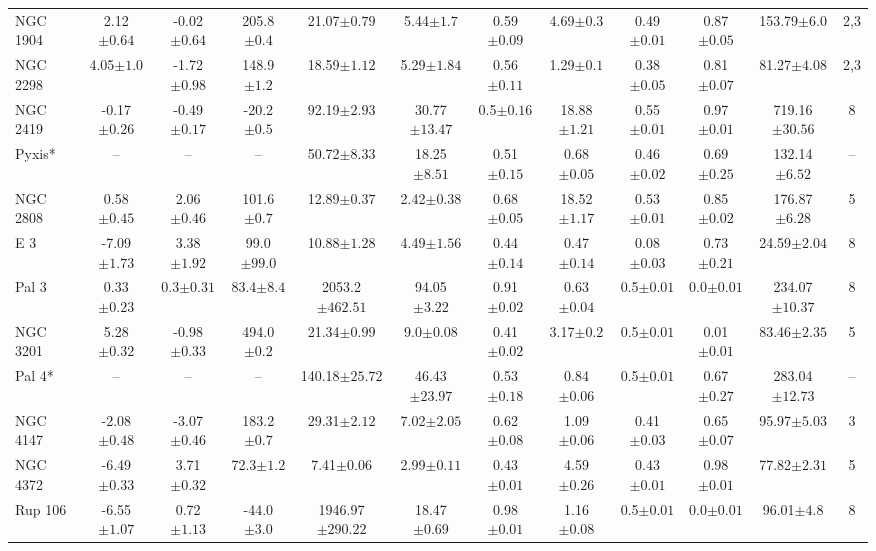 \begin{landscape}
\begin{table}
\begin{tabular}{lccccccccccc}
NGC 1904 & 2.12$\pm{0.64}$ & -0.02$\pm{0.64}$ & 205.8$\pm{0.4}$ & 21.07$\pm{0.79}$ & 5.44$\pm{1.7}$ & 0.59$\pm{0.09}$ & 4.69$\pm{0.3}$ & 0.49$\pm{0.01}$ & 0.87$\pm{0.05}$ & 153.79$\pm{6.0}$&2,3 \\ 
NGC 2298 & 4.05$\pm{1.0}$ & -1.72$\pm{0.98}$ & 148.9$\pm{1.2}$ & 18.59$\pm{1.12}$ & 5.29$\pm{1.84}$ & 0.56$\pm{0.11}$ & 1.29$\pm{0.1}$ & 0.38$\pm{0.05}$ & 0.81$\pm{0.07}$ & 81.27$\pm{4.08}$&2,3 \\ 
NGC 2419 & -0.17$\pm{0.26}$ & -0.49$\pm{0.17}$ & -20.2$\pm{0.5}$ & 92.19$\pm{2.93}$ & 30.77$\pm{13.47}$ & 0.5$\pm{0.16}$ & 18.88$\pm{1.21}$ & 0.55$\pm{0.01}$ & 0.97$\pm{0.01}$ & 719.16$\pm{30.56}$&8 \\ 
Pyxis* & -- & -- & -- & 50.72$\pm{8.33}$ & 18.25$\pm{8.51}$ & 0.51$\pm{0.15}$ & 0.68$\pm{0.05}$ & 0.46$\pm{0.02}$ & 0.69$\pm{0.25}$ & 132.14$\pm{6.52}$&-- \\ 
NGC 2808 & 0.58$\pm{0.45}$ & 2.06$\pm{0.46}$ & 101.6$\pm{0.7}$ & 12.89$\pm{0.37}$ & 2.42$\pm{0.38}$ & 0.68$\pm{0.05}$ & 18.52$\pm{1.17}$ & 0.53$\pm{0.01}$ & 0.85$\pm{0.02}$ & 176.87$\pm{6.28}$&5 \\ 
E 3 & -7.09$\pm{1.73}$ & 3.38$\pm{1.92}$ & 99.0$\pm{99.0}$ & 10.88$\pm{1.28}$ & 4.49$\pm{1.56}$ & 0.44$\pm{0.14}$ & 0.47$\pm{0.14}$ & 0.08$\pm{0.03}$ & 0.73$\pm{0.21}$ & 24.59$\pm{2.04}$&8 \\ 
Pal 3 & 0.33$\pm{0.23}$ & 0.3$\pm{0.31}$ & 83.4$\pm{8.4}$ & 2053.2$\pm{462.51}$ & 94.05$\pm{3.22}$ & 0.91$\pm{0.02}$ & 0.63$\pm{0.04}$ & 0.5$\pm{0.01}$ & 0.0$\pm{0.01}$ & 234.07$\pm{10.37}$&8 \\ 
NGC 3201 & 5.28$\pm{0.32}$ & -0.98$\pm{0.33}$ & 494.0$\pm{0.2}$ & 21.34$\pm{0.99}$ & 9.0$\pm{0.08}$ & 0.41$\pm{0.02}$ & 3.17$\pm{0.2}$ & 0.5$\pm{0.01}$ & 0.01$\pm{0.01}$ & 83.46$\pm{2.35}$&5 \\ 
Pal 4* & -- & -- & -- & 140.18$\pm{25.72}$ & 46.43$\pm{23.97}$ & 0.53$\pm{0.18}$ & 0.84$\pm{0.06}$ & 0.5$\pm{0.01}$ & 0.67$\pm{0.27}$ & 283.04$\pm{12.73}$&-- \\ 
NGC 4147 & -2.08$\pm{0.48}$ & -3.07$\pm{0.46}$ & 183.2$\pm{0.7}$ & 29.31$\pm{2.12}$ & 7.02$\pm{2.05}$ & 0.62$\pm{0.08}$ & 1.09$\pm{0.06}$ & 0.41$\pm{0.03}$ & 0.65$\pm{0.07}$ & 95.97$\pm{5.03}$&3 \\ 
NGC 4372 & -6.49$\pm{0.33}$ & 3.71$\pm{0.32}$ & 72.3$\pm{1.2}$ & 7.41$\pm{0.06}$ & 2.99$\pm{0.11}$ & 0.43$\pm{0.01}$ & 4.59$\pm{0.26}$ & 0.43$\pm{0.01}$ & 0.98$\pm{0.01}$ & 77.82$\pm{2.31}$&5 \\ 
Rup 106 & -6.55$\pm{1.07}$ & 0.72$\pm{1.13}$ & -44.0$\pm{3.0}$ & 1946.97$\pm{290.22}$ & 18.47$\pm{0.69}$ & 0.98$\pm{0.01}$ & 1.16$\pm{0.08}$ & 0.5$\pm{0.01}$ & 0.0$\pm{0.01}$ & 96.01$\pm{4.8}$&8 \\ 

\end{tabular}
\end{table}
\end{landscape}
